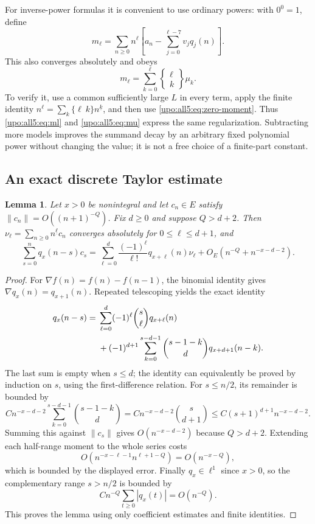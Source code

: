 \documentclass[11pt,letterpaper]{article}
\newtheorem{lemma}[theorem]{Lemma}
\theoremstyle{remark}\newtheorem{remark}[theorem]{Remark}
\numberwithin{equation}{section}
\newcommand{\fall}[2]{#1^{\underline{#2}}}
\begin{document}
For inverse-power formulas it is convenient to use ordinary powers:
with $0^0=1$, define
\begin{equation}\label{upo:all5:eq:ml}
 m_\ell=\sum_{n\ge0}n^\ell
       \left[a_n-\sum_{j=0}^{\ell-7}v_jq_j(n)\right].
\end{equation}
This also converges absolutely and obeys
\begin{equation}\label{upo:all5:eq:stirling}
 m_\ell=\sum_{k=0}^\ell
            \left\{\begin{matrix}\ell\\k\end{matrix}\right\}\mu_k.
\end{equation}
To verify it, use a common sufficiently large $L$ in every term,
apply the finite identity $n^\ell=\sum_k\{\ell\ k\}\fall nk$,
and then use \eqref{upo:all5:eq:zero-moment}. Thus \eqref{upo:all5:eq:ml} and
\eqref{upo:all5:eq:mu} express the same regularization. Subtracting more
models improves the summand decay by an arbitrary fixed polynomial
power without changing the value; it is not a free choice of a
finite-part constant.

\subsection{An exact discrete Taylor estimate}\label{upo:all5:sec:taylor}
\begin{lemma}\label{upo:all5:lem:endpoint}
Let $x>0$ be nonintegral and let $c_n\in E$ satisfy
$\|c_n\|=O((n+1)^{-Q})$. Fix $d\ge0$ and suppose $Q>d+2$.
Then $\nu_\ell=\sum_{n\ge0}\fall n\ell c_n$ converges absolutely
for $0\le\ell\le d+1$, and
\begin{equation}\label{upo:all5:eq:endpoint-lemma}
 \sum_{s=0}^n q_x(n-s)c_s
   =\sum_{\ell=0}^d\frac{(-1)^\ell}{\ell!}
        q_{x+\ell}(n)\nu_\ell
         +O_E(n^{-Q}+n^{-x-d-2}).
\end{equation}
\end{lemma}
\begin{proof}
For $\nabla f(n)=f(n)-f(n-1)$, the binomial identity gives
$\nabla q_x(n)=q_{x+1}(n)$. Repeated telescoping yields the exact
identity
\begin{align}\label{upo:all5:eq:discrete-taylor}
 q_x(n-s)={}&\sum_{\ell=0}^d(-1)^\ell\binom{s}{\ell}q_{x+\ell}(n)
 \notag\\
 &+(-1)^{d+1}\sum_{k=0}^{s-d-1}
            \binom{s-1-k}{d}q_{x+d+1}(n-k).
\end{align}
The last sum is empty when $s\le d$; the identity can equivalently
be proved by induction on $s$, using the first-difference relation.
For $s\le n/2$, its remainder is bounded by
\[
 Cn^{-x-d-2}\sum_{k=0}^{s-d-1}\binom{s-1-k}{d}
       =Cn^{-x-d-2}\binom{s}{d+1}
       \le C(s+1)^{d+1}n^{-x-d-2}.
\]
Summing this against $\|c_s\|$ gives $O(n^{-x-d-2})$ because
$Q>d+2$. Extending each half-range moment to the whole series costs
\[
 O(n^{-x-\ell-1}n^{\ell+1-Q})=O(n^{-x-Q}),
\]
which is bounded by the displayed error. Finally $q_x\in\ell^1$
since $x>0$, so the complementary range $s>n/2$ is bounded by
\[
 Cn^{-Q}\sum_{t\ge0}|q_x(t)|=O(n^{-Q}).
\]
This proves the lemma using only coefficient estimates and finite
identities.
\end{proof}
\end{document}
